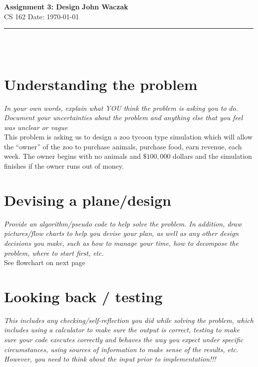 \documentclass[a4paper, 11pt]{article}
\begin{document}
\noindent
\large\textbf{Assignment 3: Design} \hfill \textbf{John Waczak} \\
\normalsize CS 162 \hfill  Date: \today 
\par\noindent\rule{\textwidth}{0.4pt} \\\\



\section*{Understanding the problem}

\textit{In your own words, explain what YOU think the problem is asking you to
  do.  Document your uncertainties about the problem and anything else that you
  feel was unclear or vague}\\

This problem is asking us to design a zoo tycoon type simulation which will
allow the ``owner'' of the zoo to purchase animals, purchase food, earn revenue,
each week. The owner begins with no animals and $\$100,000$ dollars and the
simulation finishes if the owner runs out of money. 

\section*{Devising a plane/design}

\textit{Provide an algorithm/pseudo code to help solve the problem. In addition,
  draw pictures/flow charts to help you devise your plan, as well as any other
  design decisions you make, such as how to manage your time, how to decompose
  the problem, where to start first, etc. }\\ 

See flowchart on next page





\section*{Looking back / testing}

\textit{This includes any checking/self-reflection you did while solving the
  problem, which includes using a calculator to make sure the output is correct,
  testing to make sure your code executes correctly and behaves the way you
  expect under specific circumstances, using sources of information to make
  sense of the results, etc. However, you need to think about the input prior to
  implementation!!!}\\
\vspace{5em}
\end{document}
